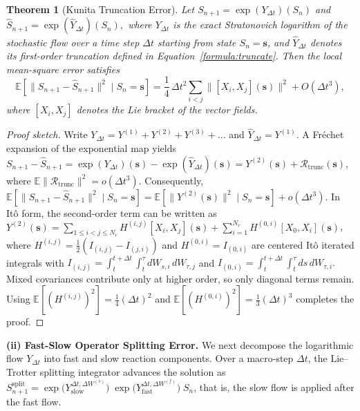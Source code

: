 \documentclass{article}
\newtheorem{theorem}{Theorem}
\begin{document}
\begin{theorem}[Kunita Truncation Error]
\label{lem:truncation}
Let
$
S_{n+1} = \exp(Y_{\Delta t})(S_n)$ and $
\widehat{S}_{n+1} = \exp(\widehat{Y}_{\Delta t})(S_n),$
where $Y_{\Delta t}$ is the exact Stratonovich logarithm of the stochastic flow
over a time step $\Delta t$ starting from state $S_n=\pmb{s}$, and $\widehat{Y}_{\Delta t}$ denotes its first-order
truncation defined in Equation~\eqref{formula:truncate}.
Then the local mean-square error satisfies
\begin{equation}
\label{eq:Kunita_truncation}
\mathbb{E}\!\left[
\|S_{n+1}-\widehat{S}_{n+1}\|^2
\mid S_n=\pmb{s}
\right]
=
\frac14\,\Delta t^2
\sum_{i<j}
\|[X_i,X_j](\pmb{s})\|^2
+
O(\Delta t^3),
\end{equation}
where $[X_i,X_j]$ denotes the Lie bracket of the vector fields.
\end{theorem}

\begin{proof}[Proof sketch]
Write $Y_{\Delta t}=Y^{(1)}+Y^{(2)}+Y^{(3)}+\ldots$ and
$\hat Y_{\Delta t}=Y^{(1)}$.
A Fréchet expansion of the exponential map yields
$S_{n+1}-\hat S_{n+1}
=\exp(Y_{\Delta t})(\pmb{s})-\exp(\hat Y_{\Delta t})(\pmb{s})
=Y^{(2)}(\pmb{s})+\mathcal R_{\mathrm{trunc}}(\pmb{s})$, where
$\mathbb E\|\mathcal R_{\mathrm{trunc}}\|^{2}=o(\Delta t^3)$.
Consequently,
$\mathbb E[\|S_{n+1}-\hat S_{n+1}\|^{2}\mid S_n=\pmb{s}]
=\mathbb E[\|Y^{(2)}(\pmb{s})\|^{2}\mid S_n=\pmb{s}]+o(\Delta t^{3})$.
In Itô form, the second‑order term can be written as
$Y^{(2)}(\pmb{s})
=\sum_{1\le i<j\le N_r}H^{(i,j)}[X_i,X_j](\pmb{s})
 +\sum_{i=1}^{N_r} H^{(0,i)}[X_0,X_i](\pmb{s})$,
where 
$H^{(i,j)}=\tfrac12(I_{(i,j)}-I_{(j,i)})$ and $H^{(0,i)}=I_{(0,i)}$ are
centered Itô iterated integrals with
$I_{(i,j)} = \int_t^{t+\Delta t} \int_t^{\tau} dW_{s,i}\, dW_{\tau,j}$ and $
I_{(0,i)} = \int_t^{t+\Delta t} \int_t^{\tau} ds\, dW_{\tau,i}.$ 
Mixed covariances contribute only at higher
order, so only diagonal terms remain.
Using $\mathbb E[(H^{(i,j)})^{2}]=\tfrac14(\Delta t)^2$ and
$\mathbb E[(H^{(0,i)})^{2}]=\tfrac13(\Delta t)^3$ completes the proof.
\end{proof}

\textbf{(ii) Fast-Slow Operator Splitting Error.}
We next decompose the logarithmic flow $Y_{\Delta t}$ into fast and slow
reaction components. Over a macro‑step $\Delta t$, the Lie–Trotter splitting
integrator advances the solution as
$S^{\mathrm{split}}_{n+1}
= \exp\!\big(Y_{\mathrm{slow}}^{\Delta t,\Delta W^{(s)}}\big)\;
  \exp\!\big(Y_{\mathrm{fast}}^{\Delta t,\Delta W^{(f)}}\big)\; S_n$,
that is, the slow flow is applied after the fast flow. 
\end{document}
